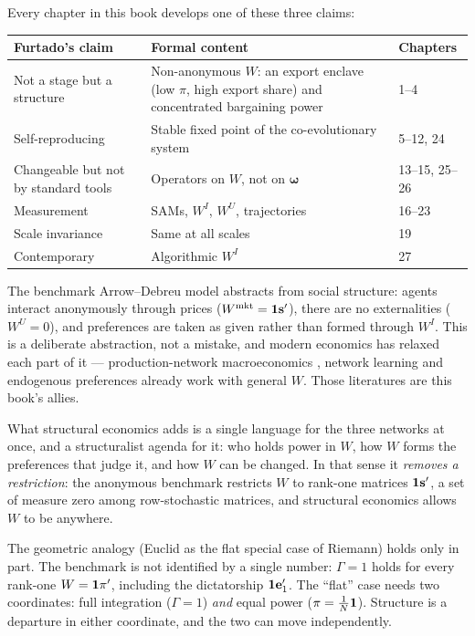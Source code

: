 \documentclass[../structural_economics_book.tex]{subfiles}
\begin{document}
\begin{remark}
Every chapter in this book develops one of these three claims:
\begin{center}
\begin{tabularx}{\textwidth}{LLL}
\toprule
\textbf{Furtado's claim} & \textbf{Formal content} & \textbf{Chapters} \\
\midrule
Not a stage but a structure & Non-anonymous $W$: an export enclave (low $\pi$, high export share) and concentrated bargaining power & 1--4 \\
Self-reproducing & Stable fixed point of the co-evolutionary system & 5--12, 24 \\
Changeable but not by standard tools & Operators on $W$, not on $\boldsymbol{\omega}$ & 13--15, 25--26 \\
\midrule
Measurement & SAMs, $W^I$, $W^U$, trajectories & 16--23 \\
Scale invariance & Same at all scales & 19 \\
Contemporary & Algorithmic $W^I$ & 27 \\
\bottomrule
\end{tabularx}
\end{center}
\end{remark}

\begin{intuition}
The benchmark Arrow--Debreu model abstracts from social structure: agents interact anonymously through prices ($W^{\text{mkt}} = \mathbf{1}\mathbf{s}'$), there are no externalities ($W^U = 0$), and preferences are taken as given rather than formed through $W^I$. This is a deliberate abstraction, not a mistake, and modern economics has relaxed each part of it --- production-network macroeconomics \citep{long1983real,acemoglu2012network,baqaee2019macroeconomic}, network learning \citep{degroot1974reaching,golub2010naive,golub2012how} and endogenous preferences already work with general $W$. Those literatures are this book's allies.

What structural economics adds is a single language for the three networks at once, and a structuralist agenda for it: who holds power in $W$, how $W$ forms the preferences that judge it, and how $W$ can be changed. In that sense it \textit{removes a restriction}: the anonymous benchmark restricts $W$ to rank-one matrices $\mathbf{1}\mathbf{s}'$, a set of measure zero among row-stochastic matrices, and structural economics allows $W$ to be anywhere.

The geometric analogy (Euclid as the flat special case of Riemann) holds only in part. The benchmark is not identified by a single number: $\Gamma = 1$ holds for every rank-one $W = \mathbf{1}\pi'$, including the dictatorship $\mathbf{1}\mathbf{e}_1'$. The ``flat'' case needs two coordinates: full integration ($\Gamma = 1$) \emph{and} equal power ($\pi = \tfrac{1}{N}\mathbf{1}$). Structure is a departure in either coordinate, and the two can move independently.
\end{intuition}
\end{document}
